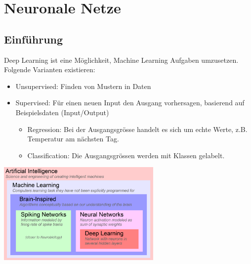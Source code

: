 



\chapter{Neuronale Netze}
\section{Einführung}
Deep Learning ist eine Möglichkeit, Machine Learning Aufgaben umzusetzen. Folgende Varianten existieren: 
\begin{itemize}[noitemsep,topsep=3pt]
	\item Unsupervised: Finden von Mustern in Daten
	\item Supervised: Für einen neuen Input den Ausgang vorhersagen, basierend auf Beispielsdaten (Input/Output)
	\begin{itemize}[noitemsep]
		\item Regression: Bei der Ausgangsgrösse handelt es sich um echte Werte, z.B. Temperatur am nächsten Tag.
		\item Classification: Die Ausgangsgrössen werden mit Klassen gelabelt. 
	\end{itemize}
\end{itemize}
\begin{center}
		\includegraphics[width=0.6\textwidth]{../fig/ai_overview}
\end{center}
